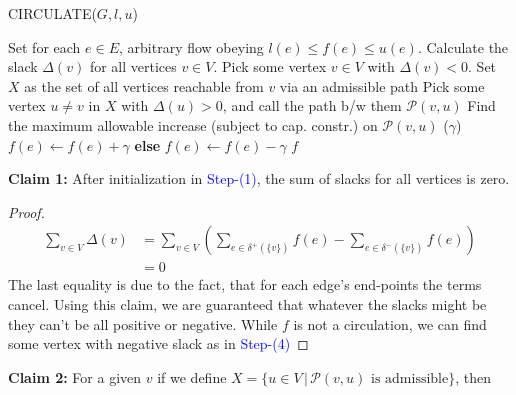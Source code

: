 \documentclass{article}
\newcommand{\stepNumber}[1]{\textcolor{blue}{Step-(#1)}}
\begin{document}
        \begin{algorithm}[H]
            \caption{CIRCULATE($G, l, u$)}
            \begin{algorithmic}[1]
                \State Set for each $e\in E$, arbitrary flow obeying $l(e) \le f(e)\le u(e)$. 
                \State Calculate the slack $\Delta(v)$ for all vertices $v \in V$. 
                    \State Pick some vertex $v \in V$ with $\Delta(v) < 0$. 
                    \State Set $X$ as the set of all vertices reachable from $v$ via an admissible path
                    \State Pick some vertex $u \not= v$ in $X$ with $\Delta(u) > 0$, and call the path b/w them $\mathcal{P}(v, u)$
                    \State Find the maximum allowable increase (subject to cap.  constr.) on $\mathcal{P}(v, u)$ ($\gamma$)
                            \State $f(e) \leftarrow f(e) + \gamma$
                        \EndIf
                        \State \textbf{else}
                        \State \indent $f(e) \leftarrow f(e) - \gamma$
                    \EndFor
                \EndWhile
                \Return $f$
            \end{algorithmic}
        \end{algorithm}
        \noindent \textbf{Claim 1:} After initialization in \stepNumber{1}, the sum of slacks for all vertices is zero. 
            \begin{proof}
                \begin{equation*}
                    \begin{split}
                        \sum_{v \in V} \Delta(v) &= \sum_{v \in V} \left(\sum_{e \in \delta^+(\{v\})} f(e) - \sum_{e \in \delta^-(\{v\})} f(e)\right)\\
                        &= 0 
                    \end{split}
                \end{equation*}
                The last equality is due to the fact, that for each edge's end-points the terms cancel. Using this claim, we are guaranteed that whatever the slacks might be they can't be all positive or negative. While $f$ is not a circulation, we can find some vertex with negative slack as in \stepNumber{4}
            \end{proof}
        \noindent \textbf{Claim 2:}  For a given $v$ if we define $X = \{u \in V \, | \, \mathcal{P}(v, u) \text{ is admissible}\}$, then
\end{document}
